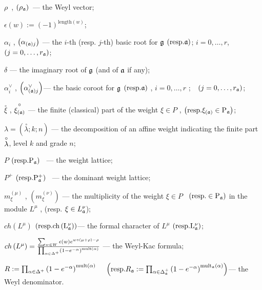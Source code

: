 \documentclass[12pt]{article}
\theoremstyle{definition}
\begin{document}
$\rho $\ , $\left( \rho _{\frak{a}}\right) $\ --- the Weyl vector;

$\epsilon \left( w\right) :=\left( -1\right) ^{\mathrm{length}(w)}$;

$\alpha _{i}$ , $\left( \alpha _{\left( \frak{a}\right) j}\right) $ --- the $%
i $-th (resp. $j$-th) basic root for $\frak{g}$ $\left( \mathrm{{resp. }%
\frak{a}}\right) $; $i=0,\ldots ,r$,\ \ $\left( j=0,\ldots ,r_{\frak{a}%
}\right) $;

$\delta $ --- the imaginary root of $\frak{g}$ (and of $\frak{a}$ if any);

$\alpha _{i}^{\vee }$ , $\left( \alpha _{\left( \frak{a}\right) j}^{\vee
}\right) $--- the basic coroot for $\frak{g}$ $\left( \mathrm{{resp. }\frak{a%
}}\right) $ , $i=0,\ldots ,r$ ;\ \ $\left( j=0,\ldots ,r_{\frak{a}}\right) $;

$\stackrel{\circ }{\xi }$ , $\stackrel{\circ }{\xi _{\left( \frak{a}\right) }%
}$ --- the finite (classical) part of the weight $\xi \in P$ , $\left( 
\mathrm{{resp. }\xi _{\left( \frak{a}\right) }\in P_{\frak{a}}}\right) $;

$\lambda =\left( \stackrel{\circ }{\lambda };k;n\right) $ --- the
decomposition of an affine weight indicating the finite part $\stackrel{%
\circ }{\lambda }$, level $k$ and grade $n$;

$P$ $\left( \mathrm{{resp.}P_{\frak{a}}}\right) $ \ --- the weight lattice;

$P^{+}$ $\left( \mathrm{{resp.}P_{\frak{a}}^{+}}\right) $ \ --- the dominant
weight lattice;

$m_{\xi }^{\left( \mu \right) }$ , $\left( m_{\xi }^{\left( \nu \right)
}\right) $ --- the multiplicity of the weight $\xi \in P$ \ $\left( \mathrm{{%
resp. }\in P_{\frak{a}}}\right) $ in the module $L^{\mu }$ , (resp. $\xi \in
L_{\frak{a}}^{\nu } $);

$ch\left( L^{\mu }\right) $ $\left( \mathrm{{resp. }ch\left( L_{\frak{a}%
}^{\nu }\right) }\right) $--- the formal character of $L^{\mu }$ $\left( 
\mathrm{{resp. }L_{\frak{a}}^{\nu }}\right) $;

$ch\left( L^{\mu }\right) =\frac{\sum_{w\in W}\epsilon (w)e^{w\circ (\mu
+\rho )-\rho }}{\prod_{\alpha \in \Delta ^{+}}\left( 1-e^{-\alpha }\right) ^{%
\mathrm{{mult}\left( \alpha \right) }}}$ --- the Weyl-Kac formula;

$R:=\prod_{\alpha \in \Delta ^{+}}\left( 1-e^{-\alpha }\right) ^{\mathrm{{%
mult}\left( \alpha \right) }}\quad $ $\left( \mathrm{resp.}R_{\frak{a}%
}:=\prod_{\alpha \in \Delta _{\frak{a}}^{+}}\left( 1-e^{-\alpha }\right) ^{%
\mathrm{mult}_{\frak{a}}\mathrm{\left( \alpha \right) }}\right) $--- the
Weyl denominator.
\end{document}
